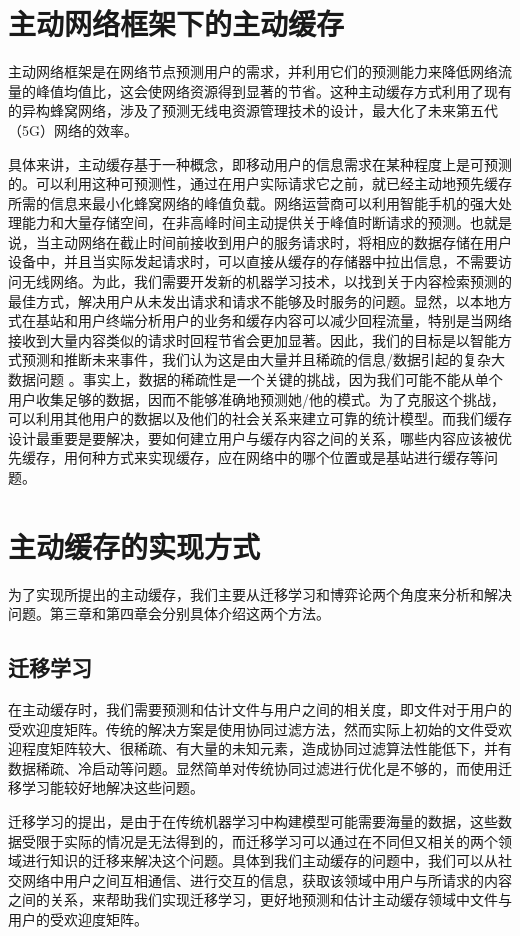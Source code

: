 \documentclass[bachelor]{seuthesis} %
\begin{document}
\begin{Main}
\section{主动网络框架下的主动缓存}
主动网络框架是在网络节点预测用户的需求，并利用它们的预测能力来降低网络流量的峰值均值比，这会使网络资源得到显著的节省。这种主动缓存方式利用了现有的异构蜂窝网络，涉及了预测无线电资源管理技术的设计，最大化了未来第五代（5G）网络的效率。\par
具体来讲，主动缓存基于一种概念，即移动用户的信息需求在某种程度上是可预测的。可以利用这种可预测性，通过在用户实际请求它之前，就已经主动地预先缓存所需的信息来最小化蜂窝网络的峰值负载。网络运营商可以利用智能手机的强大处理能力和大量存储空间，在非高峰时间主动提供关于峰值时断请求的预测。也就是说，当主动网络在截止时间前接收到用户的服务请求时，将相应的数据存储在用户设备中，并且当实际发起请求时，可以直接从缓存的存储器中拉出信息，不需要访问无线网络。为此，我们需要开发新的机器学习技术，以找到关于内容检索预测的最佳方式，解决用户从未发出请求和请求不能够及时服务的问题。显然，以本地方式在基站和用户终端分析用户的业务和缓存内容可以减少回程流量，特别是当网络接收到大量内容类似的请求时回程节省会更加显著。因此，我们的目标是以智能方式预测和推断未来事件，我们认为这是由大量并且稀疏的信息/数据引起的复杂大数据问题
\cite{laurila2012mobile}。事实上，数据的稀疏性是一个关键的挑战，因为我们可能不能从单个用户收集足够的数据，因而不能够准确地预测她/他的模式。为了克服这个挑战，可以利用其他用户的数据以及他们的社会关系来建立可靠的统计模型。而我们缓存设计最重要是要解决，要如何建立用户与缓存内容之间的关系，哪些内容应该被优先缓存，用何种方式来实现缓存，应在网络中的哪个位置或是基站进行缓存等问题。
\section{主动缓存的实现方式}
为了实现所提出的主动缓存，我们主要从迁移学习和博弈论两个角度来分析和解决问题。第三章和第四章会分别具体介绍这两个方法。
\subsection{迁移学习}
在主动缓存时，我们需要预测和估计文件与用户之间的相关度，即文件对于用户的受欢迎度矩阵。传统的解决方案是使用协同过滤方法，然而实际上初始的文件受欢迎程度矩阵较大、很稀疏、有大量的未知元素，造成协同过滤算法性能低下，并有数据稀疏、冷启动等问题。显然简单对传统协同过滤进行优化是不够的，而使用迁移学习能较好地解决这些问题。\par
迁移学习的提出，是由于在传统机器学习中构建模型可能需要海量的数据，这些数据受限于实际的情况是无法得到的，而迁移学习可以通过在不同但又相关的两个领域进行知识的迁移来解决这个问题。具体到我们主动缓存的问题中，我们可以从社交网络中用户之间互相通信、进行交互的信息，获取该领域中用户与所请求的内容之间的关系，来帮助我们实现迁移学习，更好地预测和估计主动缓存领域中文件与用户的受欢迎度矩阵。

\end{Main}
\end{document}
